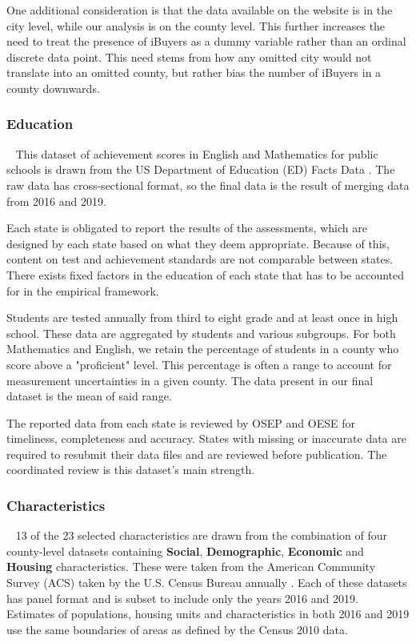 One additional consideration is that the data available on the website is in the city level, while our analysis is on the county level. This further increases the need to treat the presence of iBuyers as a dummy variable rather than an ordinal discrete data point. This need stems from how any omitted city would not translate into an omitted county, but rather bias the number of iBuyers in a county downwards.

\subsubsection{Education} 
This dataset of achievement scores in English and Mathematics for public schools is drawn from the US Department of Education (ED) Facts Data \cite{EDF}. The raw data has cross-sectional format, so the final data is the result of merging data from 2016 and 2019.  

Each state is obligated to report the results of the assessments, which are designed by each state based on what they deem appropriate. Because of this, content on test and achievement standards are not comparable between states. There exists fixed factors in the education of each state that has to be accounted for in the empirical framework.  

Students are tested annually from third to eight grade and at least once in high school. These data are aggregated by students and various subgroups. For both Mathematics and English, we retain the percentage of students in a county who score above a "proficient" level. This percentage is often a range to account for measurement uncertainties in a given county. The data present in our final dataset is the mean of said range. 

The reported data from each state is reviewed by OSEP and OESE for timeliness, completeness and accuracy. States with missing or inaccurate data are required to resubmit their data files and are reviewed before publication. The coordinated review is this dataset’s main strength. 


\subsubsection{Characteristics} 
13 of the 23 selected characteristics are drawn from the combination of four county-level datasets containing \textbf{Social}, \textbf{Demographic}, \textbf{Economic} and \textbf{Housing} characteristics. These were taken from the American Community Survey (ACS) taken by the U.S. Census Bureau annually \cite{ACS}. Each of these datasets has panel format and is subset to include only the years 2016 and 2019.  Estimates of populations, housing units and characteristics in both 2016 and 2019 use the same boundaries of areas as defined by the Census 2010 data.  


